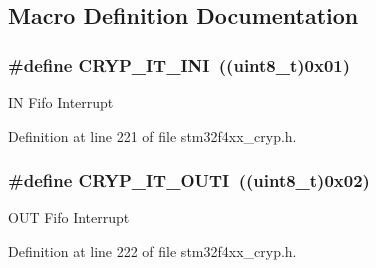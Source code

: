 \subsection{Macro Definition Documentation}
\hypertarget{group___c_r_y_p__interrupts__definition_gab6d24428b95658217df49013a81b4f7c}{
\subsubsection[{C\-R\-Y\-P\-\_\-\-I\-T\-\_\-\-I\-N\-I}]{\setlength{\rightskip}{0pt plus 5cm}\#define C\-R\-Y\-P\-\_\-\-I\-T\-\_\-\-I\-N\-I~((uint8\-\_\-t)0x01)}}\label{group___c_r_y_p__interrupts__definition_gab6d24428b95658217df49013a81b4f7c}
I\-N Fifo Interrupt 

Definition at line 221 of file stm32f4xx\-\_\-cryp.\-h.

\hypertarget{group___c_r_y_p__interrupts__definition_ga53c211cbd38a3704dfc91aa8f3d20517}{
\subsubsection[{C\-R\-Y\-P\-\_\-\-I\-T\-\_\-\-O\-U\-T\-I}]{\setlength{\rightskip}{0pt plus 5cm}\#define C\-R\-Y\-P\-\_\-\-I\-T\-\_\-\-O\-U\-T\-I~((uint8\-\_\-t)0x02)}}\label{group___c_r_y_p__interrupts__definition_ga53c211cbd38a3704dfc91aa8f3d20517}
O\-U\-T Fifo Interrupt 

Definition at line 222 of file stm32f4xx\-\_\-cryp.\-h.


